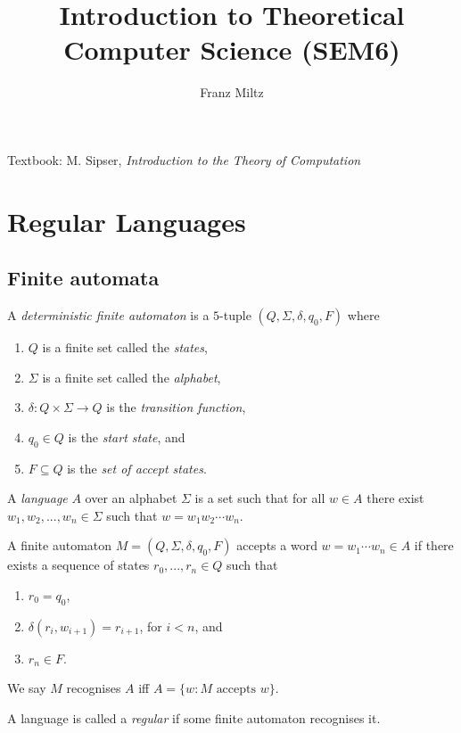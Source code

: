\documentclass{article}
\title{Introduction to Theoretical Computer Science (SEM6)}
\author{Franz Miltz}
\begin{document}
\maketitle
\noindent Textbook: M. Sipser, \emph{Introduction to the Theory of Computation}
\tableofcontents
\pagebreak

\section{Regular Languages}

\subsection{Finite automata}

\begin{definition*}
	A \emph{deterministic finite automaton} is a $5$-tuple $(Q,\Sigma,\delta,q_0,F)$ where
	\begin{enumerate}
		\item $Q$ is a finite set called the \emph{states},
		\item $\Sigma$ is a finite set called the \emph{alphabet},
		\item $\delta:Q\times\Sigma\to Q$ is the \emph{transition function},
		\item $q_0\in Q$ is the \emph{start state}, and
		\item $F\subseteq Q$ is the \emph{set of accept states}.
	\end{enumerate}
\end{definition*}

\begin{definition*}
	A \emph{language} $A$ over an alphabet $\Sigma$ is a set such that for all
	$w\in A$ there exist $w_1,w_2,...,w_n\in\Sigma$ such that $w=w_1w_2\cdots w_n$.

	A finite automaton $M=(Q,\Sigma,\delta,q_0,F)$ accepts a word $w=w_1\cdots w_n\in A$
	if there exists a sequence of states $r_0,...,r_n\in Q$ such that
	\begin{enumerate}
		\item $r_0=q_0$,
		\item $\delta(r_i,w_{i+1})=r_{i+1}$, for $i<n$, and
		\item $r_n\in F$.
	\end{enumerate}
	We say $M$ recognises $A$ iff $A=\{w : M\text{ accepts }w\}$.
\end{definition*}

\begin{definition*}
	A language is called a \emph{regular} if some finite automaton recognises it.
\end{definition*}
\end{document}
